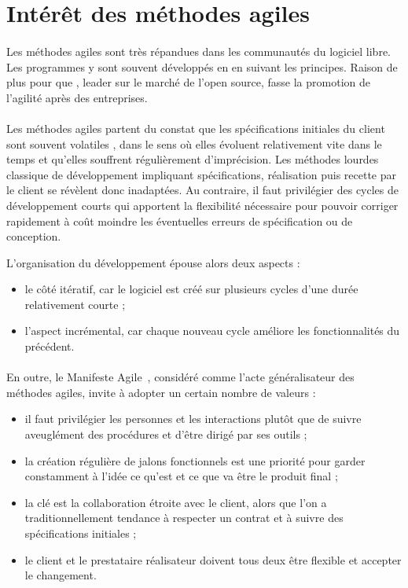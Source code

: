 \section{Intérêt des méthodes agiles}

\paragraph{}
Les méthodes agiles sont très répandues dans les communautés du logiciel libre.
Les programmes y sont souvent développés en en suivant les principes.
Raison de plus pour que \asmile{}, leader sur le marché de l'open source, fasse la promotion de l'agilité après des entreprises.


\paragraph{}
Les méthodes agiles partent du constat que les spécifications initiales du client sont souvent \og volatiles \fg, dans le sens où elles évoluent relativement vite dans le temps et qu'elles souffrent régulièrement d'imprécision.
Les méthodes lourdes classique de développement impliquant spécifications, réalisation puis recette par le client se révèlent donc inadaptées.
Au contraire, il faut privilégier des cycles de développement courts qui apportent la flexibilité nécessaire pour pouvoir corriger rapidement à coût moindre les éventuelles erreurs de spécification ou de conception.

L'organisation du développement épouse alors deux aspects :

\begin{itemize}
	\item le côté itératif, car le logiciel est créé sur plusieurs cycles d'une durée relativement courte ;
	\item l'aspect incrémental, car chaque nouveau cycle améliore les fonctionnalités du précédent.
\end{itemize}


\paragraph{}
En outre, le Manifeste Agile~\cite{agile}, considéré comme l'acte généralisateur des méthodes agiles, invite à adopter un certain nombre de valeurs :

\begin{itemize}
	\item il faut privilégier les personnes et les interactions plutôt que de suivre aveuglément des procédures et d'être dirigé par ses outils ;
	\item la création régulière de jalons fonctionnels est une priorité pour garder constamment à l'idée ce qu'est et ce que va être le produit final ;
	\item la clé est la collaboration étroite avec le client, alors que l'on a traditionnellement tendance à respecter un contrat et à suivre des spécifications initiales ;
	\item le client et le prestataire réalisateur doivent tous deux être flexible et accepter le changement.
\end{itemize}


